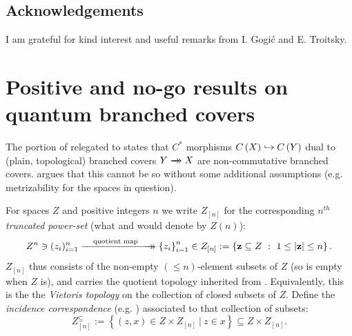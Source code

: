 \documentclass[11pt,leqno]{article}
\theoremstyle{plain}
\theoremstyle{plain}
\theoremstyle{plain}
\numberwithin{equation}{section}
\theoremstyle{nonumberplain}
\newcommand\1{{\bf 1}}
\newcommand{\xrightarrowdbl}[2][]{%
  \xrightarrow[#1]{#2}\mathrel{\mkern-14mu}\rightarrow
}
\begin{document}
\subsection*{Acknowledgements}

I am grateful for kind interest and useful remarks from I. Gogi{\'c} and E. Troitsky. 



\section{Positive and no-go results on quantum branched covers}\label{se:yy}


The portion of \cite[Theorem 1.1]{pt_brnch} relegated to \cite[Theorem 4.3]{pt_brnch} states that $C^*$ morphisms $C\left(X\right)\lhook\joinrel\to C\left(Y\right)$ dual to (plain, topological) branched covers $Y\xrightarrowdbl{} X$ are non-commutative branched covers.  argues that this cannot be so without some additional assumptions (e.g. metrizability for the spaces in question).

For spaces $Z$ and positive integers $n$ we write $Z_{[n]}$ for the corresponding {\it $n^{th}$ truncated power-set} (what \cite[p.608]{zbMATH03569401} and \cite[p.164]{MR450972} would denote by $Z(n)$):
\begin{equation}\label{eq:zn2z_n}
  Z^n
  \ni
  (z_i)_{i=1}^n
  \xrightarrowdbl[]{\quad\text{quotient map }\quad}
  \left\{z_i\right\}_{i=1}^n
  \in
  Z_{[n]}
  :=
  \left\{{\bf z}\subseteq Z\ :\ 1\le |{\bf z}|\le n\right\}.
\end{equation}
$Z_{[n]}$ thus consists of the non-empty $(\le n)$-element subsets of $Z$ (so is empty when $Z$ is), and carries the quotient topology inherited from . Equivalently, this is the the {\it Vietoris topology} \cite[\S 1.2]{ct_vietoris} on the collection of closed subsets of $Z$. Define the {\it incidence correspondence} (e.g. \cite[Example 6.12]{har_ag}) associated to that collection of subsets:
\begin{equation*}
  Z_{[n]}^{\subseteq}
  :=
  \left\{(z,x)\in Z\times Z_{[n]}\ |\ z\in x\right\}
  \subseteq
  Z\times Z_{[n]}.
\end{equation*}
\end{document}
